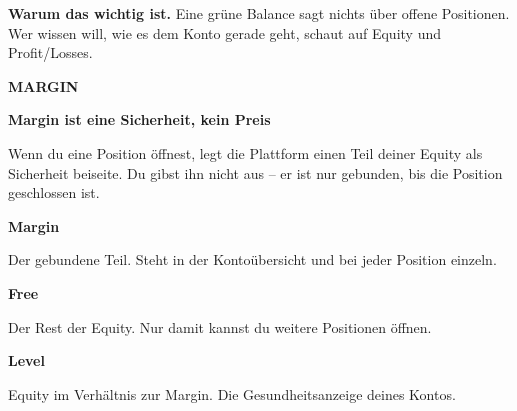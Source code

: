 \documentclass[10pt,a4paper]{article}
\newcommand{\hone}{\fontsize{19}{23}\selectfont\bfseries}
\newcommand{\htwo}{\fontsize{8}{11}\selectfont\bfseries}
\newcommand{\leadf}{\light\fontsize{11.5}{17}\selectfont}
\renewcommand{\small}{\fontsize{8.6}{12.4}\selectfont}
\newcommand{\ls}{\addfontfeatures{LetterSpace=14}}
\newcommand{\kicker}[2]{{\htwo\ls\color{muted}\MakeUppercase{#2}\par}%
  \vspace{2mm}{\color{rule}\rule{\linewidth}{0.4pt}}\par\vspace{5.5mm}}
\newcommand{\Hone}[1]{{\hone\color{ink}#1\par}\vspace{3.5mm}}
\newcommand{\lead}[1]{{\leadf\color{body}\raggedright #1\par}}
\begin{document}
\par\vspace{4mm}
\begin{merk}\textbf{Warum das wichtig ist.} Eine grüne Balance sagt nichts über offene Positionen.
Wer wissen will, wie es dem Konto gerade geht, schaut auf Equity und Profit/Losses.\end{merk}
\clearpage
\kicker{}{Margin}
\Hone{Margin ist eine Sicherheit, kein Preis}
\begin{minipage}{128mm}\lead{Wenn du eine Position öffnest, legt die Plattform einen Teil deiner Equity
als Sicherheit beiseite. Du gibst ihn nicht aus – er ist nur gebunden, bis die Position geschlossen ist.}\end{minipage}
\par\vspace{8mm}
\noindent\begin{minipage}[t]{54mm}\vspace{0pt}\raggedright
{\bfseries Margin}\par\vspace{1mm}
{\color{muted}\small Der gebundene Teil. Steht in der Kontoübersicht und bei jeder Position einzeln.}
\end{minipage}\hfill
\begin{minipage}[t]{54mm}\vspace{0pt}\raggedright
{\bfseries Free}\par\vspace{1mm}
{\color{muted}\small Der Rest der Equity. Nur damit kannst du weitere Positionen öffnen.}
\end{minipage}\hfill
\begin{minipage}[t]{54mm}\vspace{0pt}\raggedright
{\bfseries Level}\par\vspace{1mm}
{\color{muted}\small Equity im Verhältnis zur Margin. Die Gesundheitsanzeige deines Kontos.}
\end{minipage}
\par\vspace{8mm}
\end{document}
